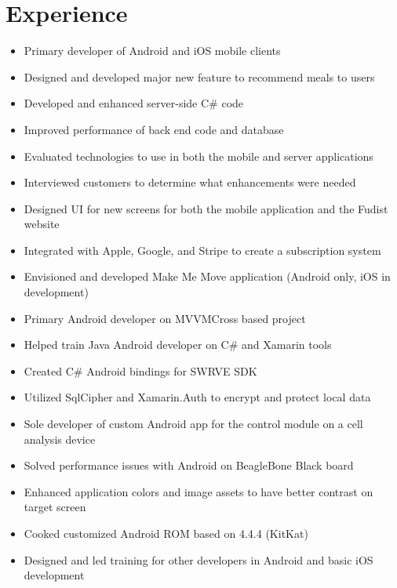 \documentclass[12pt,letterpaper,sans]{moderncv}
\begin{document}
\section{Experience}
    \begin{itemize}[leftmargin=1.24in]
    	\item Primary developer of Android and iOS mobile clients
		\item Designed and developed major new feature to recommend meals to users
		\item Developed and enhanced server-side C\# code
    	\item Improved performance of back end code and database
    	\item Evaluated technologies to use in both the mobile and server applications
    	\item Interviewed customers to determine what enhancements were needed
    	\item Designed UI for new screens for both the mobile application and the Fudist website
    	\item Integrated with Apple, Google, and Stripe to create a subscription system	
    	\item Envisioned and developed Make Me Move application (Android only, iOS in development)
    \end{itemize}
    \begin{itemize}[leftmargin=1.24in]
    	\item Primary Android developer on MVVMCross based project
    	\item Helped train Java Android developer on C\# and Xamarin tools
    	\item Created C\# Android bindings for SWRVE SDK
    	\item Utilized SqlCipher and Xamarin.Auth to encrypt and protect local data
    \end{itemize} 
    \newpage
{}
	\begin{itemize}[leftmargin=1.24in]
		\item Sole developer of custom Android app for the control module on a cell analysis device
		\item Solved performance issues with Android on BeagleBone Black board
		\item Enhanced application colors and image assets to have better contrast on target screen
		\item Cooked customized Android ROM based on 4.4.4 (KitKat)
		\item Designed and led training for other developers in Android and basic iOS development
	\end{itemize}
\end{document}
